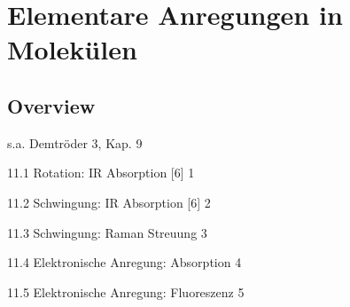 \renewcommand{\lastmod}{10. September 2024}
\renewcommand{\chapterauthors}{Markus Lippitz}

\chapter{Elementare Anregungen in Molekülen}






\section{Overview}

s.a. Demtröder 3, Kap. 9


11.1 Rotation: IR Absorption [6] 1	

11.2 Schwingung: IR Absorption [6] 2	 

11.3 Schwingung: Raman Streuung 3	 

11.4 Elektronische Anregung: Absorption 4	 

11.5 Elektronische Anregung: Fluoreszenz 5	 




\printbibliography[segment=\therefsegment,heading=subbibliography]
